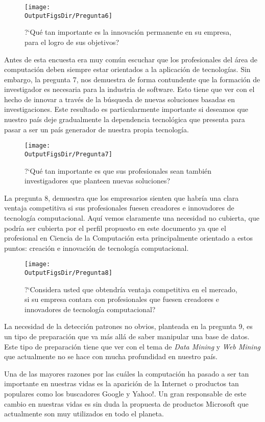 \begin{figure}[!h]
	\centering
	\texttt{[image: \\OutputFigsDir/Pregunta6]}
	\label{fig:Preg6}
	\caption{?`Qué tan importante es la innovación permanente en su empresa, para el logro de sus objetivos?}
\end{figure}

Antes de esta encuesta era muy común escuchar que los profesionales del área de computación deben siempre estar orientados a la aplicación de tecnologías. Sin embargo, la pregunta 7, nos demuestra de forma contundente que la formación de investigador es necesaria para la industria de software. Esto tiene que ver con el hecho de innovar a través de la búsqueda de nuevas soluciones basadas en investigaciones. Este resultado es particularmente importante si deseamos que nuestro país deje gradualmente la dependencia tecnológica que presenta para pasar a ser un país generador de nuestra propia tecnología.

\begin{figure}[!h]
	\centering
	\texttt{[image: \\OutputFigsDir/Pregunta7]}
	\label{fig:Preg7}
	\caption{?`Qué tan importante es que sus profesionales sean también investigadores que planteen nuevas soluciones?}
\end{figure}

La pregunta 8, demuestra que los empresarios sienten que habría una clara ventaja competitiva si sus profesionales fuesen creadores e innovadores de tecnología computacional. Aquí vemos claramente una necesidad no cubierta, que podría ser cubierta por el perfil propuesto en este documento ya que el profesional en Ciencia de la Computación esta principalmente orientado a estos puntos: creación e innovación de tecnología computacional.

\begin{figure}[!h]
	\centering
	\texttt{[image: \\OutputFigsDir/Pregunta8]}
	\label{fig:Preg8}
	\caption{?`Considera usted que obtendría ventaja competitiva en el mercado, si su empresa contara con profesionales que fuesen creadores e innovadores de tecnología computacional?}
\end{figure}

La necesidad de la detección patrones no obvios, planteada en la pregunta 9,  es un tipo de preparación que va más allá de saber manipular una base de datos. Este tipo de preparación tiene que ver con el tema de \textit{Data Mining} y \textit{Web Mining} que actualmente no se hace con mucha profundidad en nuestro país.

Una de las mayores razones por las cuáles la computación ha pasado a ser tan importante en nuestras vidas es la aparición de la Internet o productos tan populares como los buscadores Google y Yahoo!. Un gran responsable de este cambio en nuestras vidas es sin duda la propuesta de productos Microsoft que actualmente son muy utilizados en todo el planeta. 

